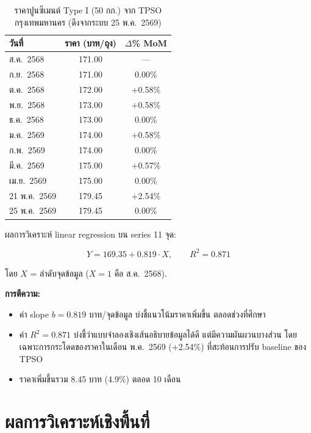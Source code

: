 \begin{table}[H]
\centering
\caption{ราคาปูนซีเมนต์ Type I (50 กก.) จาก TPSO กรุงเทพมหานคร (ดึงจากระบบ 25 พ.ค.\ 2569)}
\label{tab:cmi-mom}
\begin{tabularx}{\textwidth}{l c c}
\toprule
\textbf{วันที่} & \textbf{ราคา (บาท/ถุง)} & \textbf{$\Delta$\% MoM} \\
\midrule
ส.ค.\ 2568    & 171.00 & --- \\
ก.ย.\ 2568    & 171.00 & 0.00\% \\
ต.ค.\ 2568    & 172.00 & $+$0.58\% \\
พ.ย.\ 2568    & 173.00 & $+$0.58\% \\
ธ.ค.\ 2568    & 173.00 & 0.00\% \\
ม.ค.\ 2569    & 174.00 & $+$0.58\% \\
ก.พ.\ 2569    & 174.00 & 0.00\% \\
มี.ค.\ 2569   & 175.00 & $+$0.57\% \\
เม.ย.\ 2569   & 175.00 & 0.00\% \\
21 พ.ค.\ 2569 & 179.45 & $+$2.54\% \\
25 พ.ค.\ 2569 & 179.45 & 0.00\% \\
\bottomrule
\end{tabularx}
\end{table}

ผลการวิเคราะห์ linear regression บน series 11 จุด:

\begin{equation}
Y = 169.35 + 0.819 \cdot X, \qquad R^2 = 0.871
\end{equation}

โดย $X$ = ลำดับจุดข้อมูล ($X = 1$ คือ ส.ค.\ 2568).

\textbf{การตีความ:}
\begin{itemize}[leftmargin=2em]
  \item ค่า slope $b = 0.819$ บาท/จุดข้อมูล บ่งชี้แนวโน้มราคาเพิ่มขึ้น
        ตลอดช่วงที่ศึกษา
  \item ค่า $R^{2} = 0.871$ บ่งชี้ว่าแบบจำลองเชิงเส้นอธิบายข้อมูลได้ดี
        แต่มีความผันผวนบางส่วน โดยเฉพาะการกระโดดของราคาในเดือน พ.ค.\ 2569
        ($+$2.54\%) ที่สะท้อนการปรับ baseline ของ TPSO
  \item ราคาเพิ่มขึ้นรวม 8.45 บาท (4.9\%) ตลอด 10 เดือน
\end{itemize}

\section{ผลการวิเคราะห์เชิงพื้นที่}
\label{sec:regional-result}

